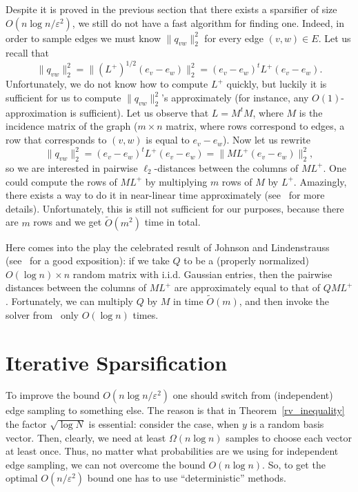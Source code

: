 \documentclass[12pt]{article}
\newcommand{\eps}{\varepsilon}
\begin{document}
    Despite it is proved in the previous section that there exists a sparsifier of size
    $O(n \log n / \eps^2)$, we still do not have a fast algorithm for finding one.
    Indeed, in order to sample edges we must know $\|q_{vw}\|_2^2$ for every edge
    $(v, w) \in E$. Let us recall that
    $$
        \|q_{vw}\|_2^2 = \|(L^+)^{1/2} (e_v - e_w)\|_2^2 =
        (e_v - e_w)^t L^+ (e_v - e_w).
    $$
    Unfortunately, we do not know how to compute $L^+$ quickly, but luckily it is sufficient
    for us to compute $\|q_{vw}\|_2^2$'s approximately (for instance, any
    $O(1)$-approximation is sufficient).
    Let us observe that $L = M^t M$, where $M$ is the incidence matrix of the graph
    ($m \times n$ matrix, where rows correspond to edges, a row that corresponds to
    $(v, w)$ is equal to $e_v - e_w$). Now let us rewrite
    $$
        \|q_{vw}\|_2^2 = (e_v - e_w)^t L^+ (e_v - e_w) =
        \|ML^+(e_v - e_w)\|_2^2,
    $$
    so we are interested in pairwise $\ell_2$-distances between the columns of $ML^+$.
    One could compute the rows of $ML^+$ by multiplying $m$ rows of $M$ by $L^+$.
    Amazingly, there exists a way to do it in near-linear time approximately
    (see~\cite{KMP10} for more details). Unfortunately, this is still not sufficient
    for our purposes, because there are $m$ rows and we get $\tilde{O}(m^2)$ time in total.

    Here comes into the play the celebrated result of Johnson and Lindenstrauss
    (see~\cite{DG03} for a good exposition): if we take $Q$ to be a (properly normalized)
    $O(\log n) \times n$ random matrix with i.i.d. Gaussian entries, then
    the pairwise distances between the columns of $ML^+$ are approximately equal to that of
    $QML^+$. Fortunately, we can multiply $Q$ by $M$ in time $\tilde{O}(m)$, and then
    invoke the solver from~\cite{KMP10} only $O(\log n)$ times.

    \section{Iterative Sparsification}
    \label{iterative}

    To improve the bound $O(n \log n / \eps^2)$ one should switch from (independent) edge sampling to something else.
    The reason is that in Theorem~\ref{rv_inequality} the factor $\sqrt{\log N}$ is essential: consider the case,
    when $y$ is a random basis vector. Then, clearly, we need at least $\Omega(n \log n)$ samples to choose each
    vector at least once. Thus, no matter what probabilities are we using for independent edge sampling, we can not
    overcome the bound $O(n \log n)$.
    So, to get the optimal $O(n / \eps^2)$ bound one has to use ``deterministic'' methods.
\end{document}
